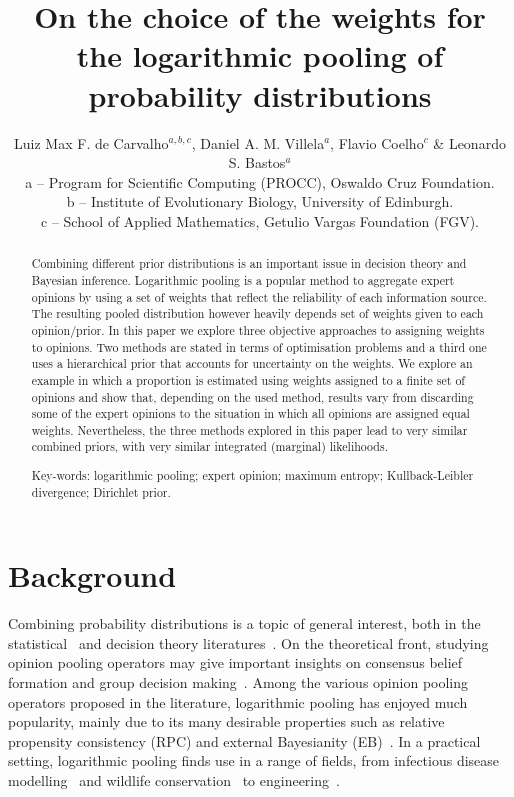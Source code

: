 \documentclass[a4paper, notitlepage, 11pt]{article}
\title{\vspace{-9ex}\centering \bf On the choice of the weights for the logarithmic pooling of probability distributions}
\author{
Luiz Max F. de Carvalho$^{a,b,c}$, Daniel A. M. Villela$^a$, Flavio Coelho$^c$ \& Leonardo S. Bastos$^a$ \\
a -- Program for Scientific Computing (PROCC), Oswaldo Cruz Foundation. \\
b -- Institute of Evolutionary Biology, University of Edinburgh.\\
c -- School of Applied Mathematics, Getulio Vargas Foundation (FGV).
}
\begin{document}
\maketitle

\begin{abstract}
Combining different prior distributions is an important issue in decision theory and Bayesian inference.
Logarithmic pooling is a popular method to aggregate expert opinions by using a set of weights that reflect the reliability of each information source.
The resulting pooled distribution however heavily depends set of weights given to each opinion/prior.
In this paper we explore three objective approaches to assigning weights to opinions.
Two methods are stated in terms of optimisation problems and a third one uses a hierarchical prior that accounts for uncertainty on the weights. 
We explore an example in which a proportion is estimated using weights assigned to a finite set of opinions and show that, depending on the used method, results vary from discarding some of the expert opinions to the situation in which all opinions are assigned equal weights.
Nevertheless, the three methods explored in this paper lead to very similar combined priors, with very similar integrated (marginal) likelihoods.

Key-words: logarithmic pooling; expert opinion; maximum entropy; Kullback-Leibler divergence; Dirichlet prior. 
\end{abstract}

\section*{Background}

Combining probability distributions is a topic of general interest, both in the statistical~\citep{genest1986A,genest1986B} and decision theory literatures~\citep{genest1984}.
On the theoretical front, studying opinion pooling operators may give important insights on consensus belief formation and group decision making~\citep{genest1986B}.
Among the various opinion pooling operators proposed in the literature, logarithmic pooling has enjoyed much popularity, mainly due to its many desirable properties such as relative propensity consistency (RPC) and external Bayesianity (EB)~\citep{genest1986A}. 
In a practical setting, logarithmic pooling finds use in a range of fields, from infectious disease modelling~\citep{Coelho2009} and wildlife conservation~\citep{poole2000} to engineering~\citep{lind1988, savchuk1994}.
\end{document}

